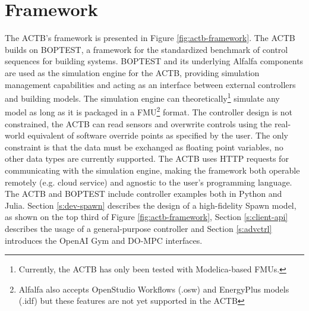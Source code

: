 \documentclass{article}
\begin{document}


\section{Framework}\label{s:framework}

The ACTB's framework is presented in Figure \ref{fig:actb-framework}. The ACTB builds on BOPTEST, a framework for the standardized benchmark of control sequences for building systems. BOPTEST and its underlying Alfalfa components are used as the simulation engine for the ACTB, providing simulation management capabilities and acting as an interface between external controllers and building models. The simulation engine can theoretically\footnote{Currently, the ACTB has only been tested with Modelica-based FMUs.} simulate any model as long as it is packaged in a FMU\footnote{Alfalfa also accepts OpenStudio Workflows (.osw) and EnergyPlus models (.idf) but these features are not yet supported in the ACTB} format.
The controller design is not constrained, the ACTB can read sensors and overwrite controls using the real-world equivalent of software override points as specified by the user. The only constraint is that the data must be exchanged as floating point variables, no other data types are currently supported. The ACTB uses HTTP requests for communicating with the simulation engine, making the framework both operable remotely (e.g. cloud service) and agnostic to the user's programming language. The ACTB and BOPTEST include controller examples both in Python and Julia.
Section \ref{s:dev-spawn} describes the design of a high-fidelity Spawn model, as shown on the top third of Figure \ref{fig:actb-framework}, Section \ref{s:client-api} describes the usage of a general-purpose controller and Section \ref{s:advctrl} introduces the OpenAI Gym and DO-MPC interfaces. 
\end{document}
